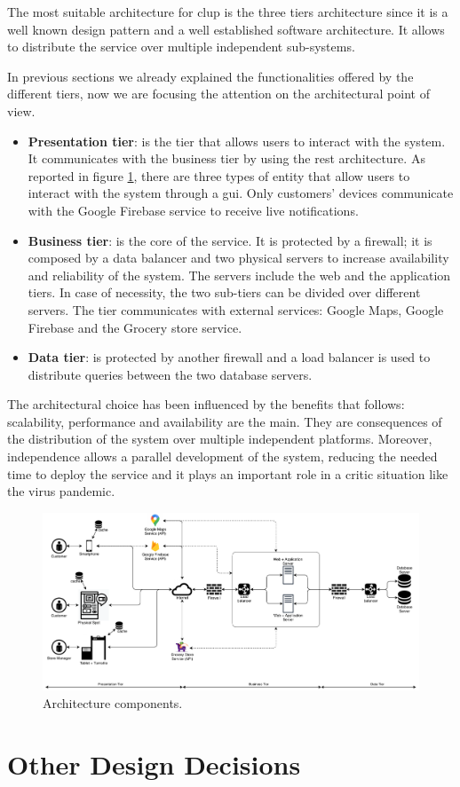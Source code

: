 The most suitable architecture for \gls{clup} is the three tiers architecture since it is a well known design pattern and a well established software architecture. It allows to distribute the service over multiple independent sub-systems.

In previous sections we already explained the functionalities offered by the different tiers, now we are focusing the attention on the architectural point of view.
\begin{itemize}
	\item \textbf{Presentation tier}: is the tier that allows users to interact with the system. It communicates with the business tier by using the \gls{rest} architecture.
	As reported in figure \ref{fig:ArchitectureComponents}, there are three types of entity that allow users to interact with the system through a \gls{gui}. Only customers' devices communicate with the Google Firebase service to receive live notifications.
	\item \textbf{Business tier}: is the core of the service. It is protected by a firewall; it is composed by a data balancer and two physical servers to increase availability and reliability of the system. The servers include the web and the application tiers. In case of necessity, the two sub-tiers can be divided over different servers.
	The tier communicates with external services: Google Maps, Google Firebase and the Grocery store service.
	\item \textbf{Data tier}: is protected by another firewall and a load balancer is used to distribute queries between the two database servers.
\end{itemize}

The architectural choice has been influenced by the benefits that follows: scalability, performance and availability are the main. They are consequences of the distribution of the system over multiple independent platforms.
Moreover, independence allows a parallel development of the system, reducing the needed time to deploy the service and it plays an important role in a critic situation like the virus pandemic.

\begin{figure}
	\centering
	\includegraphics[width=1.0\textwidth]{images/architecture_components.pdf}
	\caption{Architecture components.}\label{fig:ArchitectureComponents}
\end{figure}

\section{Other Design Decisions}